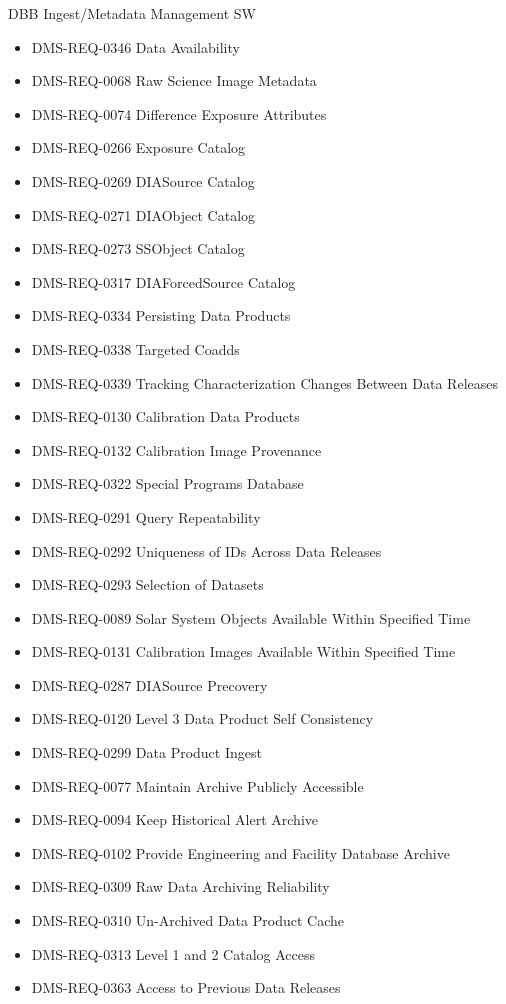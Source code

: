 DBB Ingest/Metadata Management SW \begin{itemize}
\item DMS-REQ-0346 Data Availability
\item DMS-REQ-0068 Raw Science Image Metadata
\item DMS-REQ-0074 Difference Exposure Attributes
\item DMS-REQ-0266 Exposure Catalog
\item DMS-REQ-0269 DIASource Catalog
\item DMS-REQ-0271 DIAObject Catalog
\item DMS-REQ-0273 SSObject Catalog
\item DMS-REQ-0317 DIAForcedSource Catalog
\item DMS-REQ-0334 Persisting Data Products
\item DMS-REQ-0338 Targeted Coadds
\item DMS-REQ-0339 Tracking Characterization Changes Between Data Releases
\item DMS-REQ-0130 Calibration Data Products
\item DMS-REQ-0132 Calibration Image Provenance
\item DMS-REQ-0322 Special Programs Database
\item DMS-REQ-0291 Query Repeatability
\item DMS-REQ-0292 Uniqueness of IDs Across Data Releases
\item DMS-REQ-0293 Selection of Datasets
\item DMS-REQ-0089 Solar System Objects Available Within Specified Time
\item DMS-REQ-0131 Calibration Images Available Within Specified Time
\item DMS-REQ-0287 DIASource Precovery
\item DMS-REQ-0120 Level 3 Data Product Self Consistency
\item DMS-REQ-0299 Data Product Ingest
\item DMS-REQ-0077 Maintain Archive Publicly Accessible
\item DMS-REQ-0094 Keep Historical Alert Archive
\item DMS-REQ-0102 Provide Engineering and Facility Database Archive
\item DMS-REQ-0309 Raw Data Archiving Reliability
\item DMS-REQ-0310 Un-Archived Data Product Cache
\item DMS-REQ-0313 Level 1 and 2 Catalog Access
\item DMS-REQ-0363 Access to Previous Data Releases

\end{itemize}
